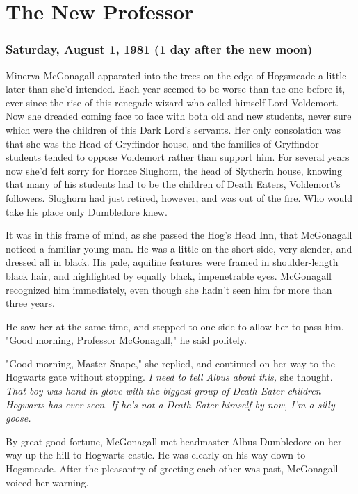 
\chapter{The New Professor}

\subsection{Saturday, August 1, 1981 (1 day after the new moon)}

Minerva McGonagall apparated into the trees on the edge of Hogsmeade a little later than she'd intended. Each year seemed to be worse than the one before it, ever since the rise of this renegade wizard who called himself Lord Voldemort. Now she dreaded coming face to face with both old and new students, never sure which were the children of this Dark Lord's servants. Her only consolation was that she was the Head of Gryffindor house, and the families of Gryffindor students tended to oppose Voldemort rather than support him. For several years now she'd felt sorry for Horace Slughorn, the head of Slytherin house, knowing that many of his students had to be the children of Death Eaters, Voldemort's followers. Slughorn had just retired, however, and was out of the fire. Who would take his place only Dumbledore knew.

It was in this frame of mind, as she passed the Hog's Head Inn, that McGonagall noticed a familiar young man. He was a little on the short side, very slender, and dressed all in black. His pale, aquiline features were framed in shoulder-length black hair, and highlighted by equally black, impenetrable eyes. McGonagall recognized him immediately, even though she hadn't seen him for more than three years.

He saw her at the same time, and stepped to one side to allow her to pass him. "Good morning, Professor McGonagall," he said politely.

"Good morning, Master Snape," she replied, and continued on her way to the Hogwarts gate without stopping. \emph{I need to tell Albus about this,} she thought. \emph{That boy was hand in glove with the biggest group of Death Eater children Hogwarts has ever seen. If he's not a Death Eater himself by now, I'm a silly goose.}

By great good fortune, McGonagall met headmaster Albus Dumbledore on her way up the hill to Hogwarts castle. He was clearly on his way down to Hogsmeade. After the pleasantry of greeting each other was past, McGonagall voiced her warning.


